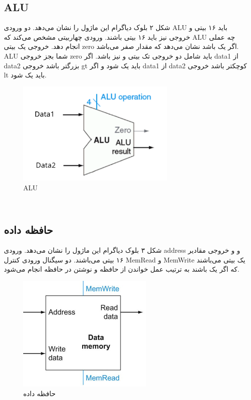 \subsection{ALU}
{شکل ۲ بلوک دیاگرام این ماژول را نشان می‌دهد. دو ورودی ALU باید ۱۶ بیتی و خروجی  نیز باید ۱۶ بیتی باشند. ورودی چهاربیتی  مشخص می‌کند که ALU چه عملی انجام دهد. خروجی یک بیتی zero اگر یک باشد نشان می‌دهد که مقدار  صفر می‌باشد. ALU شما بجز خروجی zero باید شامل دو خروجی تک بیتی  و  نیز باشد. اگر data1 از data2 بزرگتر باشد خروجی gt باید یک شود و اگر data1 از data2 کوچکتر باشد خروجی lt باید یک شود.}\\
\begin{figure}[H]
    \centering
    \includegraphics[width=0.7\textwidth]{images/MIPS_ALU.png}
    \caption{ALU}
    \label{MIPS_ALU}
\end{figure}\\

\subsection{حافظه داده}
{شکل ۳ بلوک دیاگرام این ماژول را نشان می‌دهد. ورودی address و  و خروجی  مقادیر ۱۶ بیتی می‌باشند. دو سیگنال ورودی کنترل MemRead و MemWrite یک بیتی می‌باشند که اگر یک باشند به ترتیب عمل خواندن از حافظه و نوشتن در حافظه انجام می‌شود.}
\begin{figure}[H]
    \centering
    \includegraphics[width=0.6\textwidth]{images/Data_Memory.jpg}
    \caption{حافظه داده}
    \label{Data_Memory}
\end{figure}\\
